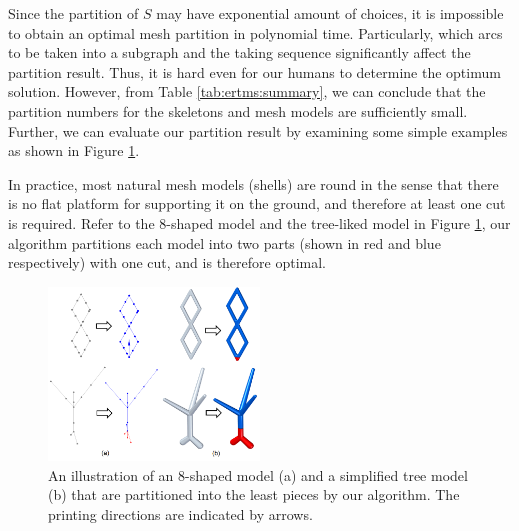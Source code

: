 Since the partition of $S$ may have exponential amount of choices, it is impossible to obtain an optimal mesh partition in polynomial time. Particularly, which arcs to be taken into a subgraph and the taking sequence significantly affect the partition result. Thus, it is hard even for our humans to determine the optimum solution. However, from Table \ref{tab:ertms:summary}, we can conclude that the partition numbers for the skeletons and mesh models are sufficiently small. Further, we can evaluate our partition result by examining some simple examples as shown in Figure \ref{fig:simpletree}.

In practice, most natural mesh models (shells) are round in the sense that there is no flat platform for supporting it on the ground, and therefore at least one cut is required. Refer to the 8-shaped model and the tree-liked model in Figure \ref{fig:simpletree}, our algorithm partitions each model into two parts (shown in red and blue respectively) with one cut, and is therefore optimal.

\begin{figure}[tbp]
  \centering
  \includegraphics[width=0.5\textwidth]{figs/simpletree.png}
  \caption{\label{fig:simpletree}%
           An illustration of an 8-shaped model (a) and a simplified tree model (b) that are partitioned into the least pieces by our algorithm. The printing directions are indicated by arrows.}
\end{figure}



